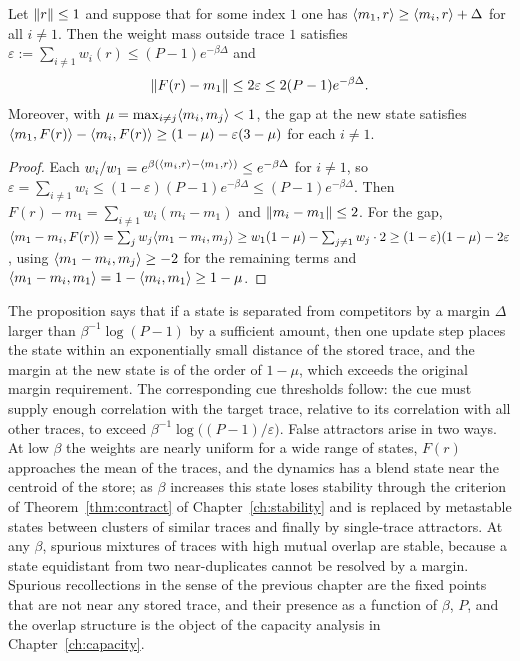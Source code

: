 \begin{proposition}\label{prop:basin}
Let $\lVert r\rVert\le1$ and suppose that for some index $1$ one has $\langle m_1,r\rangle\ge\langle m_i,r\rangle+\Delta$ for all $i\ne1$. Then the weight mass outside trace $1$ satisfies $\varepsilon:=\sum_{i\ne1}w_i(r)\le(P-1)e^{-\beta\Delta}$ and
\begin{equation}
\lVert F(r)-m_1\rVert\le2\varepsilon\le2(P-1)e^{-\beta\Delta}.
\end{equation}
Moreover, with $\mu=\max_{i\ne j}\langle m_i,m_j\rangle<1$, the gap at the new state satisfies $\langle m_1,F(r)\rangle-\langle m_i,F(r)\rangle\ge(1-\mu)-\varepsilon(3-\mu)$ for each $i\ne1$.
\end{proposition}

\begin{proof}
Each $w_i/w_1=e^{\beta(\langle m_i,r\rangle-\langle m_1,r\rangle)}\le e^{-\beta\Delta}$ for $i\ne1$, so $\varepsilon=\sum_{i\ne1}w_i\le(1-\varepsilon)(P-1)e^{-\beta\Delta}\le(P-1)e^{-\beta\Delta}$. Then $F(r)-m_1=\sum_{i\ne1}w_i(m_i-m_1)$ and $\lVert m_i-m_1\rVert\le2$. For the gap, $\langle m_1-m_i,F(r)\rangle=\sum_jw_j\langle m_1-m_i,m_j\rangle\ge w_1(1-\mu)-\sum_{j\ne1}w_j\cdot2\ge(1-\varepsilon)(1-\mu)-2\varepsilon$, using $\langle m_1-m_i,m_j\rangle\ge-2$ for the remaining terms and $\langle m_1-m_i,m_1\rangle=1-\langle m_i,m_1\rangle\ge1-\mu$.
\end{proof}

The proposition says that if a state is separated from competitors by a margin $\Delta$ larger than $\beta^{-1}\log(P-1)$ by a sufficient amount, then one update step places the state within an exponentially small distance of the stored trace, and the margin at the new state is of the order of $1-\mu$, which exceeds the original margin requirement. The corresponding cue thresholds follow: the cue must supply enough correlation with the target trace, relative to its correlation with all other traces, to exceed $\beta^{-1}\log\bigl((P-1)/\varepsilon\bigr)$. False attractors arise in two ways. At low $\beta$ the weights are nearly uniform for a wide range of states, $F(r)$ approaches the mean of the traces, and the dynamics has a blend state near the centroid of the store; as $\beta$ increases this state loses stability through the criterion of Theorem~\ref{thm:contract} of Chapter~\ref{ch:stability} and is replaced by metastable states between clusters of similar traces and finally by single-trace attractors. At any $\beta$, spurious mixtures of traces with high mutual overlap are stable, because a state equidistant from two near-duplicates cannot be resolved by a margin. Spurious recollections in the sense of the previous chapter are the fixed points that are not near any stored trace, and their presence as a function of $\beta$, $P$, and the overlap structure is the object of the capacity analysis in Chapter~\ref{ch:capacity}.

